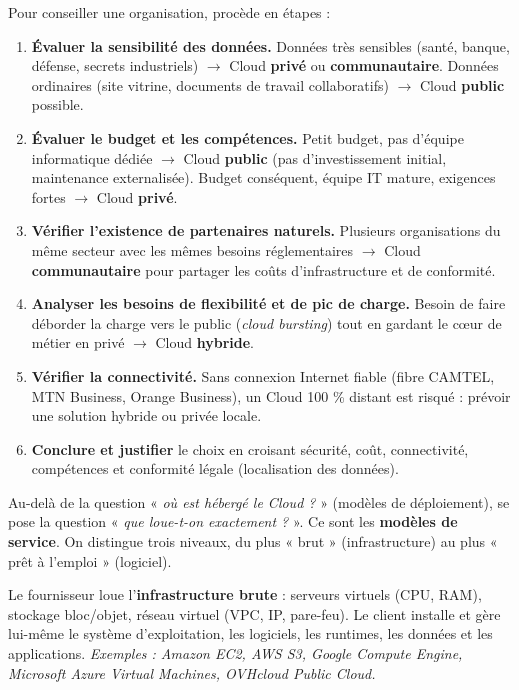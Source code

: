 \documentclass[11pt]{article}
\newcounter{popsec}
\newcounter{popsub}
\newcommand{\courssub}[1]{%
  \stepcounter{popsub}%
  \par\vspace{9pt}\noindent{\popxbold\fontsize{11.5}{13}\selectfont\color{popink}{\color{poporange}\thepopsec.\thepopsub}\hspace{6pt}#1}\par\nopagebreak\vspace{4pt}
}
\begin{document}
\begin{methode}
Pour conseiller une organisation, procède en étapes :
\begin{enumerate}
\item \textbf{Évaluer la sensibilité des données.} Données très sensibles (santé, banque, défense, secrets industriels) $\rightarrow$ Cloud \textbf{privé} ou \textbf{communautaire}. Données ordinaires (site vitrine, documents de travail collaboratifs) $\rightarrow$ Cloud \textbf{public} possible.
\item \textbf{Évaluer le budget et les compétences.} Petit budget, pas d'équipe informatique dédiée $\rightarrow$ Cloud \textbf{public} (pas d'investissement initial, maintenance externalisée). Budget conséquent, équipe IT mature, exigences fortes $\rightarrow$ Cloud \textbf{privé}.
\item \textbf{Vérifier l'existence de partenaires naturels.} Plusieurs organisations du même secteur avec les mêmes besoins réglementaires $\rightarrow$ Cloud \textbf{communautaire} pour partager les coûts d'infrastructure et de conformité.
\item \textbf{Analyser les besoins de flexibilité et de pic de charge.} Besoin de faire déborder la charge vers le public (\emph{cloud bursting}) tout en gardant le cœur de métier en privé $\rightarrow$ Cloud \textbf{hybride}.
\item \textbf{Vérifier la connectivité.} Sans connexion Internet fiable (fibre CAMTEL, MTN Business, Orange Business), un Cloud 100 \% distant est risqué : prévoir une solution hybride ou privée locale.
\item \textbf{Conclure et justifier} le choix en croisant sécurité, coût, connectivité, compétences et conformité légale (localisation des données).
\end{enumerate}
\end{methode}

\courssub{Les modèles de service : IaaS, PaaS, SaaS}

Au-delà de la question « \emph{où est hébergé le Cloud ?} » (modèles de déploiement), se pose la question « \emph{que loue-t-on exactement ?} ». Ce sont les \textbf{modèles de service}. On distingue trois niveaux, du plus « brut » (infrastructure) au plus « prêt à l'emploi » (logiciel).

\begin{definition}
Le fournisseur loue l'\textbf{infrastructure brute} : serveurs virtuels (CPU, RAM), stockage bloc/objet, réseau virtuel (VPC, IP, pare-feu). Le client installe et gère lui-même le système d'exploitation, les logiciels, les runtimes, les données et les applications. \emph{Exemples : Amazon EC2, AWS S3, Google Compute Engine, Microsoft Azure Virtual Machines, OVHcloud Public Cloud.}
\end{definition}
\end{document}
